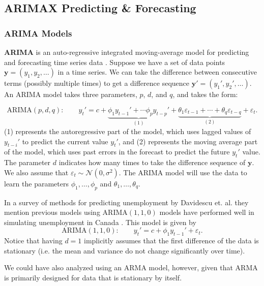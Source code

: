 \documentclass[12pt]{article}
\renewcommand{\vec}{\mathbf}
\begin{document}
    \subsection{ARIMAX Predicting \& Forecasting}
    \subsubsection{ARIMA Models}
    \textbf{ARIMA} is an auto-regressive integrated moving-average model for predicting and forecasting time series data \cite{HyndmanAthanasopoulos2021}. Suppose we have a set of data points $\vec{y} = (y_1,y_2,\dots)$ in a time series. We can take the difference between consecutive terms (possibly multiple times) to get a difference sequence $\vec{y}' = (y_1',y_2',\dots)$.
    An ARIMA model takes three parameters, $p$, $d$, and $q$, and takes the form:

    \begin{equation}
        \mathrm{ARIMA}(p,d,q)\colon \qquad y_t' = c + \underbrace{\phi_1 y_{t-1}' + \cdots \phi_p y_{t-p}'}_{(1)} + \underbrace{\theta_1 \varepsilon_{t-1} + \cdots + \theta_q\varepsilon_{t-q}}_{(2)} + \varepsilon_t.
    \end{equation}
    (1) represents the autoregressive part of the model, which uses lagged values of $y_{t-i}'$ to predict the current value $y_t'$, and (2) represents the moving average part of the model, which uses past errors in the forecast to predict the future $y_t'$ value. The parameter $d$ indicates how many times to take the difference sequence of $\vec{y}$. We also assume that $\varepsilon_t \sim \mathcal{N}(0, \sigma^2)$. The ARIMA model will use the data to learn the parameters $\phi_1,\dots,\phi_p$ and $\theta_1,\dots,\theta_q$.
    
    In a survey of methods for predicting unemployment by Davidescu et. al. they mention previous models using $\mathrm{ARIMA}(1,1,0)$ models have performed well in simulating unemployment in Canada \cite{Davidescu2021ComparativeAO}.
    This model is given by 
    \begin{equation}
        \mathrm{ARIMA}(1,1,0)\colon \qquad y_t' = c + \phi_1 y_{t-1}' + \varepsilon_t.
    \end{equation}
    Notice that having $d=1$ implicitly assumes that the first difference of the data is stationary (i.e. the mean and variance do not change significantly over time).

    We could have also analyzed using an ARMA model, however, given that ARMA is primarily designed for data that is stationary by itself.
\end{document}
